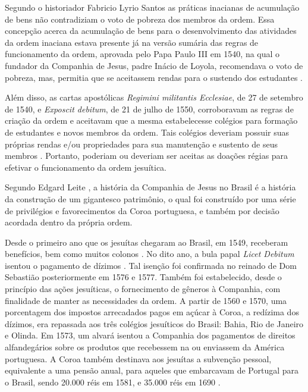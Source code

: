 Segundo o historiador Fabricio Lyrio Santos \citeyear{Santos2008} as práticas inacianas de acumulação de bens não contradiziam o voto de pobreza dos membros da ordem. Essa concepção acerca da acumulação de bens para o desenvolvimento das atividades da ordem inaciana estava presente já na versão sumária das regras de funcionamento da ordem, aprovada pelo Papa Paulo III em 1540, na qual o fundador da Companhia de Jesus, padre Inácio de Loyola, recomendava o voto de pobreza, mas, permitia que se aceitassem rendas para o sustendo dos estudantes \cite{Santos2008}.  

Além disso, as cartas apostólicas \textit{Regimini militantis Ecclesiae}, de 27 de setembro de 1540, e \textit{Exposcit debitum}, de 21 de julho de 1550, corroboravam as regras de criação da ordem e aceitavam que a mesma estabelecesse colégios para formação de estudantes e novos membros da ordem. Tais colégios deveriam possuir suas próprias rendas e/ou propriedades para sua manutenção e sustento de seus membros \cite{Santos2008}. Portanto, poderiam ou deveriam ser aceitas as doações régias para efetivar o funcionamento da ordem jesuítica.  

Segundo Edgard Leite \citeyear[p.~60]{Leite2000}, a história da Companhia de Jesus no Brasil é a história da construção de um gigantesco patrimônio, o qual foi construído por uma série de privilégios e favorecimentos da Coroa portuguesa, e também por decisão acordada dentro da própria ordem. 

Desde o primeiro ano que os jesuítas chegaram ao Brasil, em 1549, receberam benefícios, bem como muitos colonos \cite[p.~30--71]{Fragoso2001}. No dito ano, a bula papal \textit{Licet Debitum} isentou o pagamento de dízimos \cite[Tombo~VII,~p.~103]{Leite2004}. Tal isenção foi confirmada no reinado de Dom Sebastião posteriormente em 1576 e 1577. Também foi estabelecido, desde o princípio das ações jesuíticas, o fornecimento de gêneros à Companhia, com finalidade de manter as necessidades da ordem. A partir de 1560 e 1570, uma porcentagem dos impostos arrecadados pagos em açúcar à Coroa, a redízima dos dízimos, era repassada aos três colégios jesuíticos do Brasil: Bahia, Rio de Janeiro e Olinda. Em 1573, um alvará isentou a Companhia dos pagamentos de direitos alfandegários sobre os produtos que recebessem na ou enviassem da América portuguesa. A Coroa também destinava aos jesuítas a subvenção pessoal, equivalente a uma pensão anual, para aqueles que embarcavam de Portugal para o Brasil, sendo 20.000 réis em 1581, e 35.000 réis em 1690 \cite[p.~60--61]{Leite2000}. 

